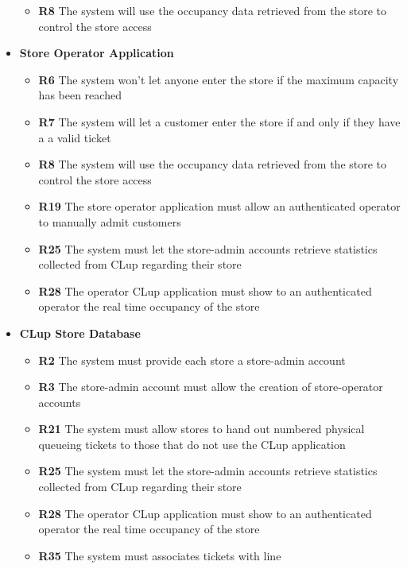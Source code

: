 \begin{itemize}
\begin{itemize}
              \item \textbf{R8} The system will use the occupancy data retrieved from the store to control the store access
          \end{itemize}
    \item \colorbox{clup_yellow}{\textbf{Store Operator Application}}
          \begin{itemize}
              \item \textbf{R6} The system won’t let anyone enter the store if the maximum capacity has been reached
              \item \textbf{R7} The system will let a customer enter the store if and only if they have a a valid ticket
              \item \textbf{R8} The system will use the occupancy data retrieved from the store to control the store access
              \item \textbf{R19} The store operator application must allow an authenticated operator to manually admit customers
              \item \textbf{R25} The system must let the store-admin accounts retrieve statistics collected from CLup regarding their store
              \item \textbf{R28} The operator CLup application must show to an authenticated operator the real time occupancy of the store
          \end{itemize}
    \item \colorbox{clup_yellow}{\textbf{CLup Store Database}}
          \begin{itemize}
              \item \textbf{R2} The system must provide each store a store-admin account
              \item \textbf{R3} The store-admin account must allow the creation of store-operator accounts
              \item \textbf{R21} The system must allow stores to hand out numbered physical queueing tickets to those that do not use the CLup application
              \item \textbf{R25} The system must let the store-admin accounts retrieve statistics collected from CLup regarding their store
              \item \textbf{R28} The operator CLup application must show to an authenticated operator the real time occupancy of the store
              \item \textbf{R35} The system must associates tickets with line
          \end{itemize}
\end{itemize}